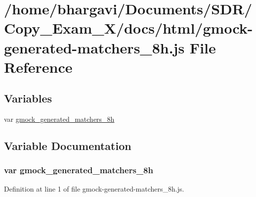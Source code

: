 \hypertarget{gmock-generated-matchers__8h_8js}{}\section{/home/bhargavi/\+Documents/\+S\+D\+R/\+Copy\+\_\+\+Exam\+\_\+X/docs/html/gmock-\/generated-\/matchers\+\_\+8h.js File Reference}
\label{gmock-generated-matchers__8h_8js}
\subsection*{Variables}
\begin{DoxyCompactItemize}
\item 
var \hyperlink{gmock-generated-matchers__8h_8js_a69a7e9c839c76178dd870c5585a67c51}{gmock\+\_\+generated\+\_\+matchers\+\_\+8h}
\end{DoxyCompactItemize}


\subsection{Variable Documentation}
\subsubsection[{\texorpdfstring{gmock\+\_\+generated\+\_\+matchers\+\_\+8h}{gmock_generated_matchers_8h}}]{\setlength{\rightskip}{0pt plus 5cm}var gmock\+\_\+generated\+\_\+matchers\+\_\+8h}\hypertarget{gmock-generated-matchers__8h_8js_a69a7e9c839c76178dd870c5585a67c51}{}\label{gmock-generated-matchers__8h_8js_a69a7e9c839c76178dd870c5585a67c51}


Definition at line 1 of file gmock-\/generated-\/matchers\+\_\+8h.\+js.

